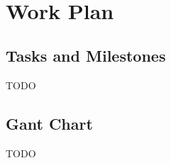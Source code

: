 
%
\   
\chapter{Work Plan}
\label{cha:work_plan}

\glsresetall

\section{Tasks and Milestones}
\label{sec:tasks_milestones}

TODO

\section{Gant Chart}
\label{sec:gant_chart}

TODO
